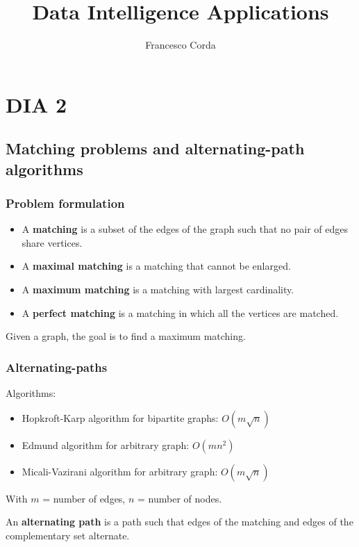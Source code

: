 \documentclass[10pt,a4paper]{article}
\author{Francesco Corda}
\title{Data Intelligence Applications}
\begin{document}
\maketitle
\tableofcontents
\newpage
\section{DIA 2}\label{dia-2}

\subsection{Matching problems and alternating-path algorithms}\label{matching-problems-and-alternating-path-algorithms}

\subsubsection{Problem formulation}\label{problem-formulation}

\begin{itemize}
\item A \textbf{matching} is a subset of the edges of the graph such that no pair of edges share vertices.
\item A \textbf{maximal matching} is a matching that cannot be enlarged.
\item A \textbf{maximum matching} is a matching with largest cardinality.
\item A \textbf{perfect matching} is a matching in which all the vertices are matched.
\end{itemize}

Given a graph, the goal is to find a maximum matching.

\subsubsection{Alternating-paths}\label{alternating-paths}

Algorithms:

\begin{itemize}
\item Hopkroft-Karp algorithm for bipartite graphs: $O(m \sqrt n)$
\item Edmund algorithm for arbitrary graph: $O(m n^2)$
\item Micali-Vazirani algorithm for arbitrary graph: $O(m \sqrt n)$
\end{itemize}
With $m$ = number of edges, $n$ = number of nodes.

An \textbf{alternating path} is a path such that edges of the matching and edges of the complementary set alternate.
\end{document}

